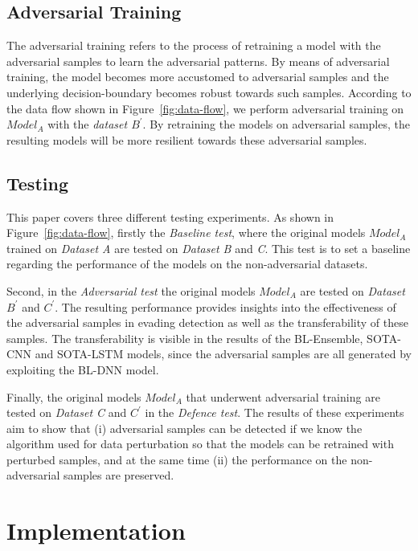 \documentclass[conference]{IEEEtran}
\begin{document}
\subsection{Adversarial Training}
%
The adversarial training refers to the process of retraining a model with the adversarial samples to learn the adversarial patterns. By means of adversarial training, the model becomes more accustomed to adversarial samples and the underlying decision-boundary becomes robust towards such samples. According to the data flow shown in Figure~\ref{fig:data-flow}, we perform adversarial training on \textit{$Model_{A}$} with the \textit{dataset $B^{\prime}$}. By retraining the models on adversarial samples, the resulting models will be more resilient towards these adversarial samples.



\subsection{Testing}
%
This paper covers three different testing experiments. As shown in Figure~\ref{fig:data-flow}, firstly the \textit{Baseline test}, where the original models \textit{$Model_{A}$} trained on \textit{Dataset A} are tested on \textit{Dataset B} and \textit{C}. This test is to set a baseline regarding the performance of the models on the non-adversarial datasets.

Second, in the \textit{Adversarial test}  the original models \textit{$Model_{A}$} are tested on \textit{Dataset $B^{\prime}$} and \textit{$C^{\prime}$}. %
The resulting performance provides insights into the effectiveness of the adversarial samples in evading detection as well as the transferability of these samples. The transferability is visible in the results of the BL-Ensemble, SOTA-CNN and SOTA-LSTM models, since the adversarial samples are all generated by exploiting the BL-DNN model.

Finally,  the original models \textit{$Model_{A}$} that underwent adversarial training are tested on \textit{Dataset C} and \textit{$C^{\prime}$} in the \textit{Defence test}. The results of these experiments aim to show that (i) adversarial samples can be detected if we know the algorithm used for data perturbation so that the models can be retrained with perturbed samples, and at the same time (ii) the performance on the non-adversarial samples are preserved.



\section{Implementation}
\label{sec:evaluation}
\end{document}
